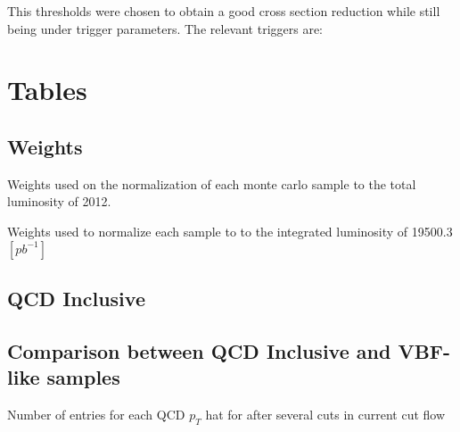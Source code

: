\documentclass[a4paper,10pt]{article}
\begin{document}
This thresholds were chosen to obtain a good cross section reduction while still being under trigger parameters. The relevant triggers are:



\section{Tables}

\subsection{Weights}

Weights used on the normalization of each monte carlo sample to the total luminosity of 2012.

\begin{table}[!h]
\centering

\caption{Weights used to normalize each sample to to the integrated luminosity of 19500.3 $[pb^{-1}]$}
\end{table}

\clearpage
\subsection{QCD Inclusive}

\begin{table}[!h]
\centering
\resizebox{\linewidth}{!}{}
\caption{}
\end{table}

\begin{table}[!h]
\centering
\resizebox{\linewidth}{!}{}
\caption{}
\end{table}

\begin{table}[!h]
\centering
\resizebox{\linewidth}{!}{}
\caption{}
\end{table}

\clearpage
\subsection{Comparison between QCD Inclusive and VBF-like samples}

\begin{table}[!h]
\centering
\resizebox{\linewidth}{!}{}
\caption{Number of entries for each QCD $p_T$ hat for after several cuts in current cut flow}
\end{table}
\end{document}
